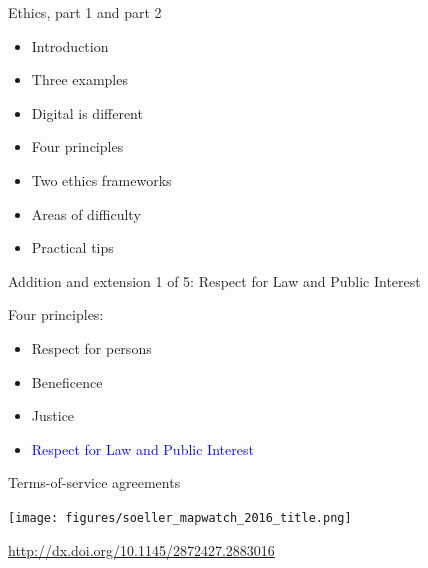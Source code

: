 \documentclass{beamer}
\begin{document}
\begin{frame}

Ethics, part 1 and part 2
\begin{itemize}
\item Introduction
\item Three examples
\item Digital is different
\item Four principles
\item Two ethics frameworks
\item Areas of difficulty
\item Practical tips
\end{itemize}

\end{frame}
\begin{frame}

\begin{center}
Addition and extension 1 of 5: Respect for Law and Public Interest
\end{center}

\end{frame}
\begin{frame}

Four principles:
\begin{itemize}
\item Respect for persons
\item Beneficence
\item Justice
\item \textcolor{blue}{Respect for Law and Public Interest}
\end{itemize}

\end{frame}
\begin{frame}

Terms-of-service agreements

\end{frame}
\begin{frame}

\begin{center}
\texttt{[image: figures/soeller\_mapwatch\_2016\_title.png]}
\end{center}

\vfill
\url{http://dx.doi.org/10.1145/2872427.2883016}
\end{frame}
%
\end{document}
